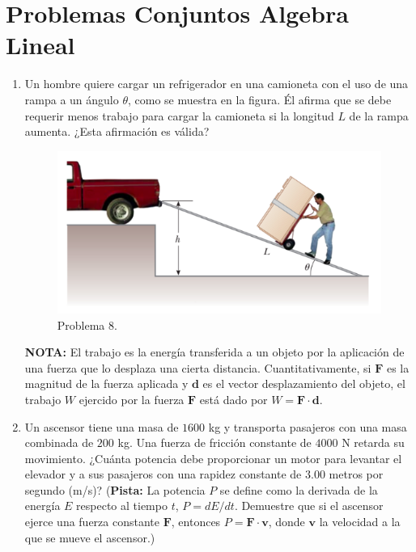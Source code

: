 \documentclass{article}
\begin{document}
\section{Problemas Conjuntos Algebra Lineal}
\begin{enumerate}

\item Un hombre quiere cargar un refrigerador en una camioneta con el uso de una rampa a un ángulo $\theta$, como se muestra en la figura. Él afirma que se debe requerir menos trabajo para cargar la camioneta si la longitud $L$ de la rampa aumenta. ¿Esta afirmación es válida?


\begin{figure}[H]
\centering
\includegraphics[scale=0.5]{problema_8.png}
\caption{Problema 8.}
\end{figure}


\textbf{NOTA:} El trabajo es la energía transferida a un objeto por la aplicación de una fuerza que lo desplaza una cierta distancia. Cuantitativamente, si $\textbf{F}$ es la magnitud de la fuerza aplicada y $\textbf{d}$ es el vector desplazamiento del objeto, el trabajo $W$ ejercido por la fuerza $\textbf{F}$ está dado por $W=\textbf{F}\cdot\textbf{d}$.

\item Un ascensor tiene una masa de $1600$ kg y transporta pasajeros con una masa combinada de $200$ kg. Una
fuerza de fricción constante de $4000$ N retarda su movimiento. ¿Cuánta potencia debe proporcionar un motor para levantar el elevador y a sus pasajeros con una rapidez constante de $3$.$00$ metros por segundo (m/s)? (\textbf{Pista:} La potencia $P$ se define como la derivada de la energía $E$ respecto al tiempo $t$, $P=dE/dt$. Demuestre que si el ascensor ejerce una fuerza constante $\textbf{F}$, entonces $P=\textbf{F}\cdot \textbf{v}$, donde $\textbf{v}$ la velocidad a la que se mueve el ascensor.)


\end{enumerate}
\end{document}
